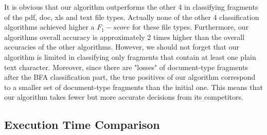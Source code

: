 It is obvious that our algorithm outperforms the other 4 in classifying fragments of the pdf, doc, xls and text file types. Actually none of the other 4 classification algorithms achieved higher a ${F_1}-score$ for these file types. Furthermore, our algorithms overall accuracy is approximately 2 times higher than the overall accuracies of the other algorithms. However, we should not forget that our algorithm is limited in classifying only fragments that contain at least one plain text character. Moreover, since there are "losses" of document-type fragments after the BFA classification part, the true positives of our algorithm correspond to a smaller set of document-type fragments than the initial one. This means that our algorithm takes fewer but more accurate decisions from its competitors.

\subsection{Execution Time Comparison}\label{sub:speed}



